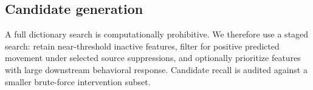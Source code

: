 \subsection{Candidate generation}

A full dictionary search is computationally prohibitive. We therefore use a staged search: retain near-threshold inactive features, filter for positive predicted movement under selected source suppressions, and optionally prioritize features with large downstream behavioral response. Candidate recall is audited against a smaller brute-force intervention subset.
